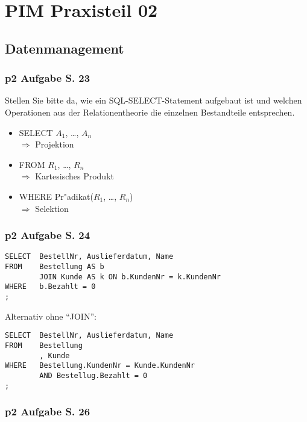 
\chapter{PIM Praxisteil 02}

\section{Datenmanagement}

\subsection{p2 Aufgabe S. 23}

Stellen Sie bitte da, wie ein SQL-SELECT-Statement aufgebaut ist und welchen Operationen aus der Relationentheorie die einzelnen Bestandteile entsprechen.
\begin{itemize}
    \item SELECT $A_1$, \dots, $A_n$\\
    $\Rightarrow$ Projektion
    \item FROM $R_1$, \dots, $R_n$\\
    $\Rightarrow$ Kartesisches Produkt
    \item WHERE Pr"adikat($R_1$, \dots, $R_n$)\\
    $\Rightarrow$ Selektion
\end{itemize}

\subsection{p2 Aufgabe S. 24}

\lstset{style=customSQL}
\begin{lstlisting}
SELECT  BestellNr, Auslieferdatum, Name
FROM    Bestellung AS b
        JOIN Kunde AS k ON b.KundenNr = k.KundenNr
WHERE   b.Bezahlt = 0
;
\end{lstlisting}

Alternativ ohne "`JOIN"':
\lstset{style=customSQL}
\begin{lstlisting}
SELECT  BestellNr, Auslieferdatum, Name
FROM    Bestellung
        , Kunde
WHERE   Bestellung.KundenNr = Kunde.KundenNr
        AND Bestellug.Bezahlt = 0
;
\end{lstlisting}


\subsection{p2 Aufgabe S. 26}

